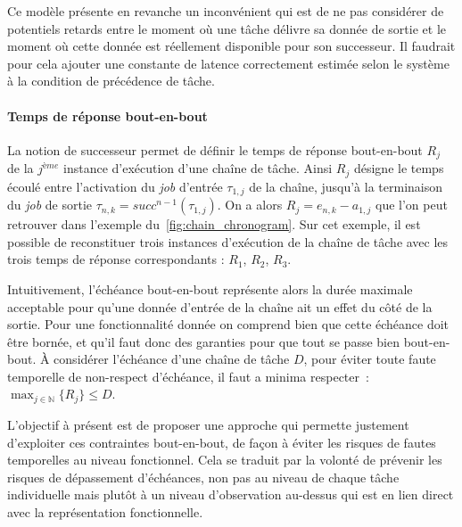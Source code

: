 \documentclass[french, a4paper, 11pt, twoside, pdftex]{StyleThese}
\begin{document}
  		Ce modèle présente en revanche un inconvénient qui est de ne pas considérer de potentiels retards entre le moment où une tâche délivre sa donnée de sortie et le moment où cette donnée est réellement disponible pour son successeur. Il faudrait pour cela ajouter une constante de latence correctement estimée selon le système à la condition de précédence de tâche.


        \paragraph{Temps de réponse bout-en-bout}

    La notion de successeur permet de définir le temps de réponse bout-en-bout $R_j$ de la $ j^{ème} $ instance d'exécution d'une chaîne de tâche. Ainsi $ R_j $ désigne le temps écoulé entre l'activation du \textit{job} d'entrée $\tau_{1, j}$ de la chaîne, jusqu'à la terminaison du \textit{job} de sortie $\tau_{n, k} = succ^{n-1}(\tau_{1, j})$.
    On a alors $R_{j} = e_{n,k} - a_{1,j}$ que l'on peut retrouver dans l'exemple du~\autoref{fig:chain_chronogram}. Sur cet exemple, il est possible de reconstituer trois instances d'exécution de la chaîne de tâche avec les trois temps de réponse correspondants : $R_1$, $R_2$, $R_3$. 
    
	Intuitivement, l'échéance bout-en-bout représente alors la durée maximale acceptable pour qu'une donnée d'entrée de la chaîne ait un effet du côté de la sortie. Pour une fonctionnalité donnée on comprend bien que cette échéance doit être bornée, et qu'il faut donc des garanties pour que tout se passe bien bout-en-bout. À considérer l'échéance d'une chaîne de tâche $D$, pour éviter toute faute temporelle de non-respect d'échéance, il faut a minima respecter~:  $\max_{j \in \mathbb{N}}\{R_j\} \leq D$.
	
	\smallbreak 
	
	L'objectif à présent est de proposer une approche qui permette justement d'exploiter ces contraintes bout-en-bout, de façon à éviter les risques de fautes temporelles au niveau fonctionnel. Cela se traduit par la volonté de prévenir les risques de dépassement d'échéances, non pas au niveau de chaque tâche individuelle mais plutôt à un niveau d'observation au-dessus qui est en lien direct avec la représentation fonctionnelle.
	
\end{document}
